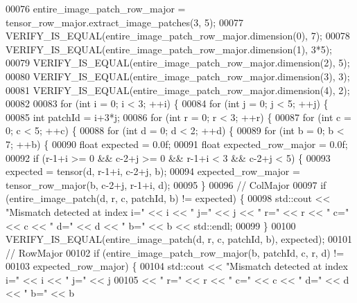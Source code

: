 \begin{DoxyCode}
00076   entire\_image\_patch\_row\_major = tensor\_row\_major.extract\_image\_patches(3, 5);
00077   VERIFY\_IS\_EQUAL(entire\_image\_patch\_row\_major.dimension(0), 7);
00078   VERIFY\_IS\_EQUAL(entire\_image\_patch\_row\_major.dimension(1), 3*5);
00079   VERIFY\_IS\_EQUAL(entire\_image\_patch\_row\_major.dimension(2), 5);
00080   VERIFY\_IS\_EQUAL(entire\_image\_patch\_row\_major.dimension(3), 3);
00081   VERIFY\_IS\_EQUAL(entire\_image\_patch\_row\_major.dimension(4), 2);
00082 
00083   \textcolor{keywordflow}{for} (\textcolor{keywordtype}{int} i = 0; i < 3; ++i) \{
00084     \textcolor{keywordflow}{for} (\textcolor{keywordtype}{int} j = 0; j < 5; ++j) \{
00085       \textcolor{keywordtype}{int} patchId = i+3*j;
00086       \textcolor{keywordflow}{for} (\textcolor{keywordtype}{int} r = 0; r < 3; ++r) \{
00087         \textcolor{keywordflow}{for} (\textcolor{keywordtype}{int} c = 0; c < 5; ++c) \{
00088           \textcolor{keywordflow}{for} (\textcolor{keywordtype}{int} d = 0; d < 2; ++d) \{
00089             \textcolor{keywordflow}{for} (\textcolor{keywordtype}{int} b = 0; b < 7; ++b) \{
00090               \textcolor{keywordtype}{float} expected = 0.0f;
00091               \textcolor{keywordtype}{float} expected\_row\_major = 0.0f;
00092               \textcolor{keywordflow}{if} (r-1+i >= 0 && c-2+j >= 0 && r-1+i < 3 && c-2+j < 5) \{
00093                 expected = tensor(d, r-1+i, c-2+j, b);
00094                 expected\_row\_major = tensor\_row\_major(b, c-2+j, r-1+i, d);
00095               \}
00096               \textcolor{comment}{// ColMajor}
00097               \textcolor{keywordflow}{if} (entire\_image\_patch(d, r, c, patchId, b) != expected) \{
00098                 std::cout << \textcolor{stringliteral}{"Mismatch detected at index i="} << i << \textcolor{stringliteral}{" j="} << j << \textcolor{stringliteral}{" r="} << r << \textcolor{stringliteral}{" c="} << c
       << \textcolor{stringliteral}{" d="} << d << \textcolor{stringliteral}{" b="} << b << std::endl;
00099               \}
00100               VERIFY\_IS\_EQUAL(entire\_image\_patch(d, r, c, patchId, b), expected);
00101               \textcolor{comment}{// RowMajor}
00102               \textcolor{keywordflow}{if} (entire\_image\_patch\_row\_major(b, patchId, c, r, d) !=
00103                   expected\_row\_major) \{
00104                 std::cout << \textcolor{stringliteral}{"Mismatch detected at index i="} << i << \textcolor{stringliteral}{" j="} << j
00105                      << \textcolor{stringliteral}{" r="} << r << \textcolor{stringliteral}{" c="} << c << \textcolor{stringliteral}{" d="} << d << \textcolor{stringliteral}{" b="} << b

\end{DoxyCode}
